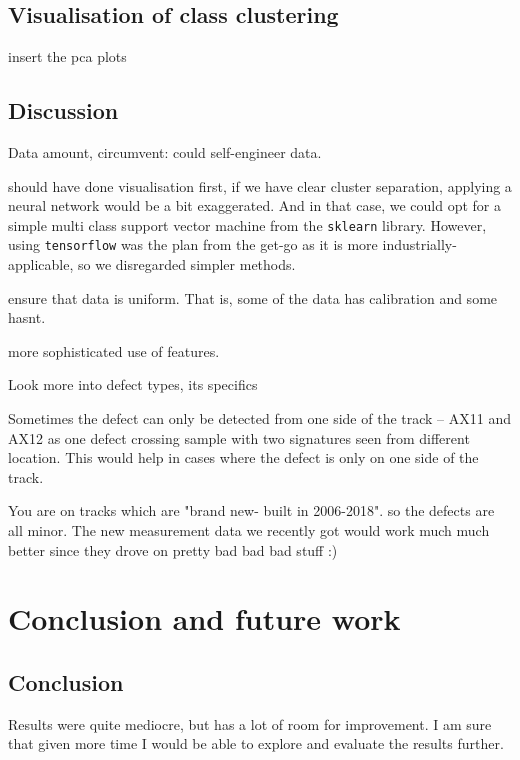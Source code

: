 \section{Visualisation of class clustering}
insert the pca plots

\section{Discussion}
Data amount, circumvent: could self-engineer data. 

should have done visualisation first, if we have clear cluster separation, applying a neural network would be a bit exaggerated. And in that case, we could opt for a simple multi class support vector machine from the \verb|sklearn| library. However, using \verb|tensorflow| was the plan from the get-go as it is more industrially-applicable, so we disregarded simpler methods.

ensure that data is uniform. That is, some of the data has calibration and some hasnt. 

more sophisticated use of features.

Look more into defect types, its specifics

Sometimes the defect can only be detected from one side of the track -- AX11 and AX12 as one defect crossing sample with two signatures seen from different location. This would help in cases where the defect is only on one side of the track.


You are on tracks which are "brand new- built in 2006-2018".  so the defects are all minor. The new measurement data we recently got would work much much better since they drove on pretty bad bad bad stuff :)

\chapter{Conclusion and future work}

\section{Conclusion}
Results were quite mediocre, but has a lot of room for improvement. I am sure that given more time I would be able to explore and evaluate the results further.

